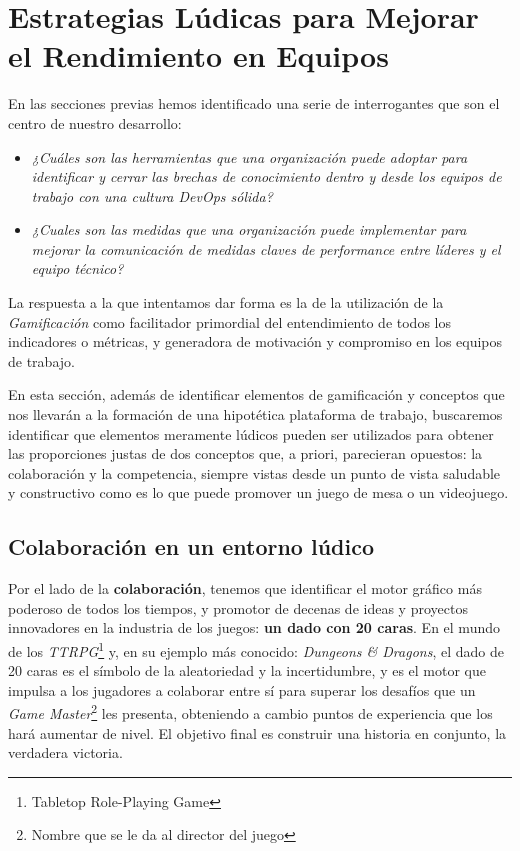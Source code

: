 \documentclass[journal]{IEEEtran}
\begin{document}
\section{\textbf{\Large Estrategias Lúdicas para Mejorar el Rendimiento en Equipos}}

En las secciones previas hemos identificado una serie de interrogantes que son el centro de nuestro desarrollo:

\begin{itemize}
    \item \textit{¿Cuáles son las herramientas que una organización puede adoptar para identificar y cerrar las brechas de conocimiento dentro y desde los equipos de trabajo con una cultura DevOps sólida?}
    \item \textit{¿Cuales son las medidas que una organización puede implementar para mejorar la comunicación de medidas claves de performance entre líderes y el equipo técnico?}
\end{itemize}
La respuesta a la que intentamos dar forma es la de la utilización de la \textit{Gamificación} como facilitador primordial del entendimiento de todos los indicadores o métricas, y generadora de motivación y compromiso en los equipos de trabajo.

En esta sección, además de identificar elementos de gamificación y conceptos que nos llevarán a la formación de una hipotética plataforma de trabajo, buscaremos identificar que elementos meramente lúdicos pueden ser utilizados para obtener las proporciones justas de dos conceptos que, a priori, parecieran opuestos: la colaboración y la competencia, siempre vistas desde un punto de vista saludable y constructivo como es lo que puede promover un juego de mesa o un videojuego.

\subsection{\textbf{Colaboración en un entorno lúdico}}
Por el lado de la \textbf{colaboración}, tenemos que identificar el motor gráfico más poderoso de todos los tiempos, y promotor de decenas de ideas y proyectos innovadores en la industria de los juegos: \textbf{un dado con 20 caras}. En el mundo de los \textit{TTRPG}\footnote{Tabletop Role-Playing Game} y, en su ejemplo más conocido: \textit{Dungeons \& Dragons}, el dado de 20 caras es el símbolo de la aleatoriedad y la incertidumbre, y es el motor que impulsa a los jugadores a colaborar entre sí para superar los desafíos que un \textit{Game Master}\footnote{Nombre que se le da al director del juego} les presenta, obteniendo a cambio puntos de experiencia que los hará aumentar de nivel. El objetivo final es construir una historia en conjunto, la verdadera victoria.
\end{document}
